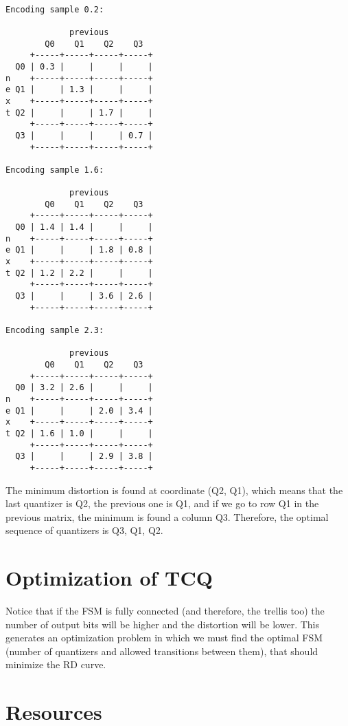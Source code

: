 \begin{verbatim}

Encoding sample 0.2:

             previous
        Q0    Q1    Q2    Q3
     +-----+-----+-----+-----+
  Q0 | 0.3 |     |     |     |
n    +-----+-----+-----+-----+
e Q1 |     | 1.3 |     |     |
x    +-----+-----+-----+-----+
t Q2 |     |     | 1.7 |     |
     +-----+-----+-----+-----+
  Q3 |     |     |     | 0.7 |
     +-----+-----+-----+-----+

Encoding sample 1.6:

             previous
        Q0    Q1    Q2    Q3
     +-----+-----+-----+-----+
  Q0 | 1.4 | 1.4 |     |     |
n    +-----+-----+-----+-----+
e Q1 |     |     | 1.8 | 0.8 |
x    +-----+-----+-----+-----+
t Q2 | 1.2 | 2.2 |     |     |
     +-----+-----+-----+-----+
  Q3 |     |     | 3.6 | 2.6 |
     +-----+-----+-----+-----+

Encoding sample 2.3:

             previous
        Q0    Q1    Q2    Q3
     +-----+-----+-----+-----+
  Q0 | 3.2 | 2.6 |     |     |
n    +-----+-----+-----+-----+
e Q1 |     |     | 2.0 | 3.4 |
x    +-----+-----+-----+-----+
t Q2 | 1.6 | 1.0 |     |     |
     +-----+-----+-----+-----+
  Q3 |     |     | 2.9 | 3.8 |
     +-----+-----+-----+-----+
\end{verbatim}

The minimum distortion is found at coordinate (Q2, Q1), which means
that the last quantizer is Q2, the previous one is Q1, and if we go to
row Q1 in the previous matrix, the minimum is found a column
Q3. Therefore, the optimal sequence of quantizers is Q3, Q1, Q2.

\section{Optimization of TCQ}
Notice that if the FSM is fully connected (and therefore, the trellis
too) the number of output bits will be higher and the distortion will
be lower. This generates an optimization problem in which we must find
the optimal FSM (number of quantizers and allowed transitions between
them), that should minimize the RD curve.

\section{Resources}

\renewcommand{\addcontentsline}[3]{} %

